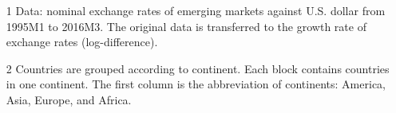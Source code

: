 \documentclass[12pt]{article}
\numberwithin{equation}{section}
\begin{document}
\begin{table}[htbp]
 \begin{minipage}{\textwidth}
{			
    \begin{itemize}
\item[1]  Data: nominal exchange rates of emerging markets against U.S. dollar from 1995M1 to 2016M3. The original data is transferred to the growth rate of exchange rates (log-difference).
\item[2]  Countries are grouped according to continent. Each block contains countries in one continent. The first column is the abbreviation of continents: America, Asia, Europe, and Africa.
\end{itemize}
}
\end{minipage}
  \label{tab:sum_stat}%

\end{table}%

\clearpage


\end{document}
